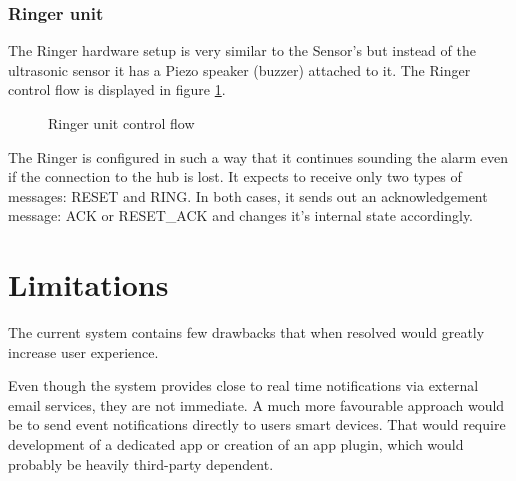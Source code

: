 \documentclass[conference]{IEEEtran}
\begin{document}
\subsubsection{Ringer unit}
The Ringer hardware setup is very similar to the Sensor's but instead of the ultrasonic sensor it has a Piezo speaker (buzzer) attached to it. The Ringer control flow is displayed in figure \ref{fig:ringer-control}.

\begin{figure}[!htb]
	\caption{\label{fig:ringer-control} Ringer unit control flow}
\end{figure}

The Ringer is configured in such a way that it continues sounding the alarm even if the connection to the hub is lost. It expects to receive only two types of messages: RESET and RING. In both cases, it sends out an acknowledgement message: ACK or RESET\_ACK and changes it's internal state accordingly. 


\section{Limitations}
The current system contains few drawbacks that when resolved would greatly increase user experience.

Even though the system provides close to real time notifications via external email services, they are not immediate. A much more favourable approach would be to send event notifications directly to users smart devices. That would require development of a dedicated app or creation of an app plugin, which would probably be heavily third-party dependent.
\end{document}
